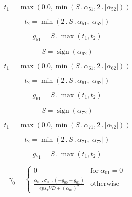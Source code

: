 \documentclass{article}
\begin{document}
\begin{dmath}t_{1} = \max\left(0.0, \min\left(S \,.\, \alpha_{51}, 2 \,.\, \left|{\alpha_{52}}\right|\right)\right)\end{dmath}

\begin{dmath}t_{2} = \min\left(2 \,.\, S \,.\, \alpha_{51}, \left|{\alpha_{52}}\right|\right)\end{dmath}

\begin{dmath}g_{51} = S \,.\, \max\left(t_{1}, t_{2}\right)\end{dmath}

\begin{dmath}S = \operatorname{sign}{\left (\alpha_{62} \right )}\end{dmath}

\begin{dmath}t_{1} = \max\left(0.0, \min\left(S \,.\, \alpha_{61}, 2 \,.\, \left|{\alpha_{62}}\right|\right)\right)\end{dmath}

\begin{dmath}t_{2} = \min\left(2 \,.\, S \,.\, \alpha_{61}, \left|{\alpha_{62}}\right|\right)\end{dmath}

\begin{dmath}g_{61} = S \,.\, \max\left(t_{1}, t_{2}\right)\end{dmath}

\begin{dmath}S = \operatorname{sign}{\left (\alpha_{72} \right )}\end{dmath}

\begin{dmath}t_{1} = \max\left(0.0, \min\left(S \,.\, \alpha_{71}, 2 \,.\, \left|{\alpha_{72}}\right|\right)\right)\end{dmath}

\begin{dmath}t_{2} = \min\left(2 \,.\, S \,.\, \alpha_{71}, \left|{\alpha_{72}}\right|\right)\end{dmath}

\begin{dmath}g_{71} = S \,.\, \max\left(t_{1}, t_{2}\right)\end{dmath}

\begin{dmath}\gamma_{0} = \begin{cases} 0 & \text{for}\: \alpha_{01} = 0 \\\frac{\alpha_{01} \,.\, \sigma_{0 0} \,.\, \left(- g_{00} + g_{01}\right)}{eps_TVD + \left(\alpha_{01} \right)^{2}} & \text{otherwise} \end{cases}\end{dmath}
\end{document}
